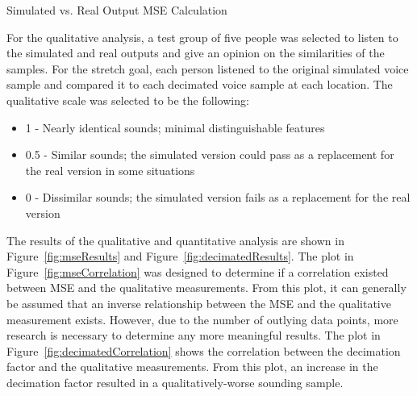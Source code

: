 \documentclass[letterpaper, 11pt, onecolumn, oneside]{article}
\begin{document}
\begin{algorithm}[H]
    \caption{Simulated vs. Real Output MSE Calculation}
    \label{alg:mse}
    \DontPrintSemicolon

       
        
     

    \BlankLine
\end{algorithm}

For the qualitative analysis, a test group of five people was selected to listen to the simulated and real outputs and give an opinion on the similarities of the samples.
For the stretch goal, each person listened to the original simulated voice sample and compared it to each decimated voice sample at each location.
The qualitative scale was selected to be the following:
\begin{itemize}
    \item 1 - Nearly identical sounds; minimal distinguishable features
    \item 0.5 - Similar sounds; the simulated version could pass as a replacement for the real version in some situations
    \item 0 - Dissimilar sounds; the simulated version fails as a replacement for the real version
\end{itemize}

The results of the qualitative and quantitative analysis are shown in Figure~\ref{fig:mseResults} and Figure~\ref{fig:decimatedResults}.
The plot in Figure~\ref{fig:mseCorrelation} was designed to determine if a correlation existed between MSE and the qualitative measurements.
From this  plot, it can generally be assumed that an inverse relationship between the MSE and the qualitative measurement exists.
However, due to the number of outlying data points, more research is necessary to determine any more meaningful results.
The plot in Figure~\ref{fig:decimatedCorrelation} shows the correlation between the decimation factor and the qualitative measurements.
From this plot, an increase in the decimation factor resulted in a qualitatively-worse sounding sample.
\end{document}
